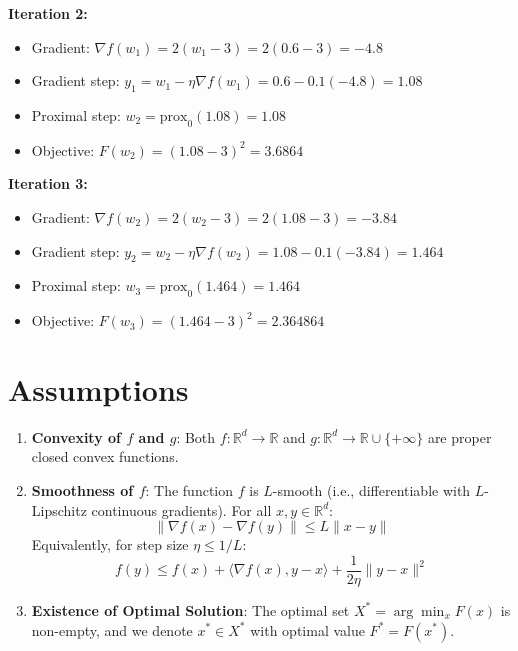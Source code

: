 \documentclass{article}
\begin{document}
\textbf{Iteration 2:}
\begin{itemize}
    \item Gradient: $\nabla f(w_1) = 2(w_1 - 3) = 2(0.6 - 3) = -4.8$
    \item Gradient step: $y_1 = w_1 - \eta \nabla f(w_1) = 0.6 - 0.1(-4.8) = 1.08$
    \item Proximal step: $w_2 = \text{prox}_{0}(1.08) = 1.08$
    \item Objective: $F(w_2) = (1.08 - 3)^2 = 3.6864$
\end{itemize}

\textbf{Iteration 3:}
\begin{itemize}
    \item Gradient: $\nabla f(w_2) = 2(w_2 - 3) = 2(1.08 - 3) = -3.84$
    \item Gradient step: $y_2 = w_2 - \eta \nabla f(w_2) = 1.08 - 0.1(-3.84) = 1.464$
    \item Proximal step: $w_3 = \text{prox}_{0}(1.464) = 1.464$
    \item Objective: $F(w_3) = (1.464 - 3)^2 = 2.364864$
\end{itemize}

\section*{Assumptions}
\begin{enumerate}
    \item \textbf{Convexity of $f$ and $g$}: Both $f: \mathbb{R}^d \to \mathbb{R}$ and $g: \mathbb{R}^d \to \mathbb{R} \cup \{+\infty\}$ are proper closed convex functions.
    \item \textbf{Smoothness of $f$}: The function $f$ is $L$-smooth (i.e., differentiable with $L$-Lipschitz continuous gradients). For all $x, y \in \mathbb{R}^d$:
    \begin{equation}
        \|\nabla f(x) - \nabla f(y)\| \leq L \|x - y\|
    \end{equation}
    Equivalently, for step size $\eta \leq 1/L$:
    \begin{equation}
        f(y) \leq f(x) + \langle \nabla f(x), y - x \rangle + \frac{1}{2\eta} \|y - x\|^2
    \end{equation}
    \item \textbf{Existence of Optimal Solution}: The optimal set $X^* = \arg\min_x F(x)$ is non-empty, and we denote $x^* \in X^*$ with optimal value $F^* = F(x^*)$.
\end{enumerate}
\end{document}
